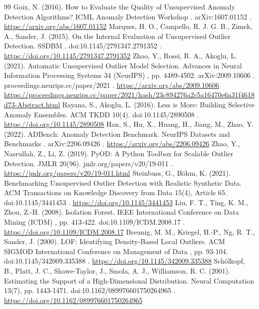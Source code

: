 \documentclass[3p,twocolumn]{elsarticle}
\begin{document}
\begin{thebibliography}{99}
\setlength{\itemsep}{2pt plus 0.5pt}\setlength{\parsep}{0pt}
\label{r1} Goix, N. (2016). How to Evaluate the Quality of Unsupervised Anomaly Detection Algorithms? ICML Anomaly Detection Workshop . arXiv:1607.01152 . \url{https://arxiv.org/abs/1607.01152}
\label{r2} Marques, H. O., Campello, R. J. G. B., Zimek, A., Sander, J. (2015). On the Internal Evaluation of Unsupervised Outlier Detection. SSDBM . doi:10.1145/2791347.2791352 . \url{https://doi.org/10.1145/2791347.2791352}
\label{r3} Zhao, Y., Rossi, R. A., Akoglu, L. (2021). Automatic Unsupervised Outlier Model Selection. Advances in Neural Information Processing Systems 34 (NeurIPS) , pp. 4489-4502. arXiv:2009.10606 . proceedings.neurips.cc/paper/2021 . \url{https://arxiv.org/abs/2009.10606} \url{https://proceedings.neurips.cc/paper/2021/hash/23c894276a2c5a16470e6a31f4618d73-Abstract.html}
\label{r4} Rayana, S., Akoglu, L. (2016). Less is More: Building Selective Anomaly Ensembles. ACM TKDD 10(4). doi:10.1145/2890508 . \url{https://doi.org/10.1145/2890508}
\label{r5} Han, S., Hu, X., Huang, H., Jiang, M., Zhao, Y. (2022). ADBench: Anomaly Detection Benchmark. NeurIPS Datasets and Benchmarks . arXiv:2206.09426 . \url{https://arxiv.org/abs/2206.09426}
\label{r6} Zhao, Y., Nasrullah, Z., Li, Z. (2019). PyOD: A Python Toolbox for Scalable Outlier Detection. JMLR 20(96). jmlr.org/papers/v20/19-011 . \url{https://jmlr.org/papers/v20/19-011.html}
\label{r7} Steinbuss, G., Böhm, K. (2021). Benchmarking Unsupervised Outlier Detection with Realistic Synthetic Data. ACM Transactions on Knowledge Discovery from Data 15(4), Article 65. doi:10.1145/3441453 . \url{https://doi.org/10.1145/3441453}
\label{r8} Liu, F. T., Ting, K. M., Zhou, Z.-H. (2008). Isolation Forest. IEEE International Conference on Data Mining (ICDM) , pp. 413-422. doi:10.1109/ICDM.2008.17 . \url{https://doi.org/10.1109/ICDM.2008.17}
\label{r9} Breunig, M. M., Kriegel, H.-P., Ng, R. T., Sander, J. (2000). LOF: Identifying Density-Based Local Outliers. ACM SIGMOD International Conference on Management of Data , pp. 93-104. doi:10.1145/342009.335388 . \url{https://doi.org/10.1145/342009.335388}
\label{r10} Schölkopf, B., Platt, J. C., Shawe-Taylor, J., Smola, A. J., Williamson, R. C. (2001). Estimating the Support of a High-Dimensional Distribution. Neural Computation 13(7), pp. 1443-1471. doi:10.1162/089976601750264965 . \url{https://doi.org/10.1162/089976601750264965}

\end{thebibliography}
\end{document}
